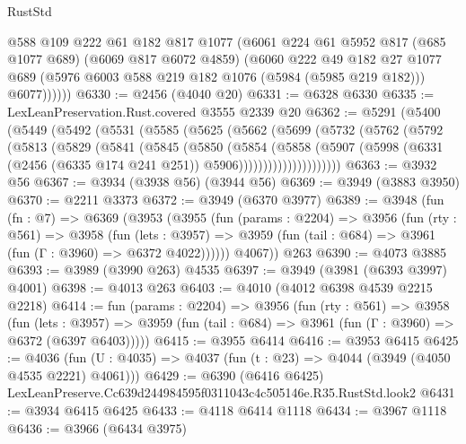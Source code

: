 \begin{lexlean}{RustStd}
\begin{coremodule}
            @588
            @109
            @222
            @61
            @182
            @817
            @1077
            (@6061
              @224
              @61
              @5952
              @817
              (@685 @1077 @689)
              (@6069 @817 @6072 @4859)
              (@6060
                @222
                @49
                @182
                @27
                @1077
                @689
                (@5976 @6003 @588 @219 @182 @1076 (@5984 (@5985 @219 @182)))
                @6077))))))
@6330 := @2456 (@4040 @20)
@6331 := @6328 @6330
@6335 := LexLeanPreservation.Rust.covered @3555 @2339 @20
@6362 := @5291
    (@5400
      (@5449
        (@5492
          (@5531
            (@5585
              (@5625
                (@5662
                  (@5699
                    (@5732
                      (@5762
                        (@5792
                          (@5813
                            (@5829
                              (@5841
                                (@5845
                                  (@5850
                                    (@5854
                                      (@5858
                                        (@5907
                                          (@5998
                                            (@6331
                                              (@2456 (@6335 @174 @241 @251))
                                              @5906)))))))))))))))))))))
@6363 := @3932 @56
@6367 := @3934 (@3938 @56) (@3944 @56)
@6369 := @3949 (@3883 @3950)
@6370 := @2211 @3373
@6372 := @3949 (@6370 @3977)
@6389 := @3948
    (fun (fn : @7) =>
    @6369
      (@3953
        (@3955
          (fun (params : @2204) =>
          @3956
            (fun (rty : @561) =>
            @3958
              (fun (lets : @3957) =>
              @3959 (fun (tail : @684) => @3961 (fun (Γ : @3960) => @6372 @4022))))))
        @4067))
    @263
@6390 := @4073 @3885
@6393 := @3989 (@3990 @263) @4535
@6397 := @3949 (@3981 (@6393 @3997) @4001)
@6398 := @4013 @263
@6403 := @4010 (@4012 @6398 @4539 @2215 @2218)
@6414 := fun (params : @2204) =>
  @3956
    (fun (rty : @561) =>
    @3958
      (fun (lets : @3957) =>
      @3959 (fun (tail : @684) => @3961 (fun (Γ : @3960) => @6372 (@6397 @6403)))))
@6415 := @3955 @6414
@6416 := @3953 @6415
@6425 := @4036 (fun (U : @4035) => @4037 (fun (t : @23) => @4044 (@3949 (@4050 @4535 @2221) @4061)))
@6429 := @6390 (@6416 @6425) LexLeanPreserve.Cc639d244984595f0311043c4c505146e.R35.RustStd.look2
@6431 := @3934 @6415 @6425
@6433 := @4118 @6414 @1118
@6434 := @3967 @1118
@6436 := @3966 (@6434 @3975)

\end{coremodule}
\end{lexlean}
